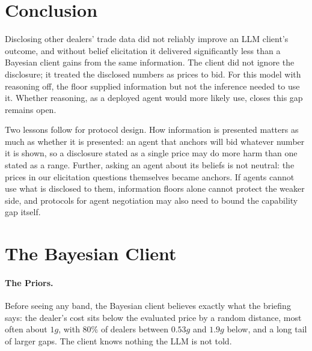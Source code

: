 \documentclass[sigconf]{acmart}
\begin{document}

\section{Conclusion}

Disclosing other dealers' trade data did not reliably improve an LLM client's outcome, and without belief elicitation it delivered significantly less than a Bayesian client gains from the same information. The client did not ignore the disclosure; it treated the disclosed numbers as prices to bid. For this model with reasoning off, the floor supplied information but not the inference needed to use it. Whether reasoning, as a deployed agent would more likely use, closes this gap remains open.

Two lessons follow for protocol design. How information is presented matters as much as whether it is presented: an agent that anchors will bid whatever number it is shown, so a disclosure stated as a single price may do more harm than one stated as a range. Further, asking an agent about its beliefs is not neutral: the prices in our elicitation questions themselves became anchors. If agents cannot use what is disclosed to them, information floors alone cannot protect the weaker side, and protocols for agent negotiation may also need to bound the capability gap itself.






\appendix

\section{The Bayesian Client}
\label{app:bayes}

\paragraph{The Priors.} Before seeing any band, the Bayesian client believes exactly what the briefing says: the dealer's cost sits below the evaluated price by a random distance, most often about $1g$, with 80\% of dealers between $0.53g$ and $1.9g$ below, and a long tail of larger gaps. The client knows nothing the LLM is not told.
\end{document}
